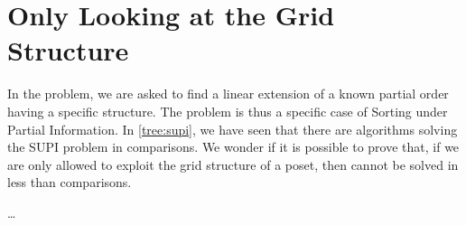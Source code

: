 \section{Only Looking at the Grid Structure}

In the \XY problem, we are asked to find a linear extension of a known partial
order having a specific structure. The \XY problem is thus a specific case of
Sorting under Partial Information. In \ref{tree:supi}, we have seen that there
are algorithms solving the SUPI problem in  comparisons. We
wonder if it is possible to prove that, if we are only allowed to exploit the
grid structure of a \XY poset, then \XY cannot be solved in less than  comparisons.

\dots
